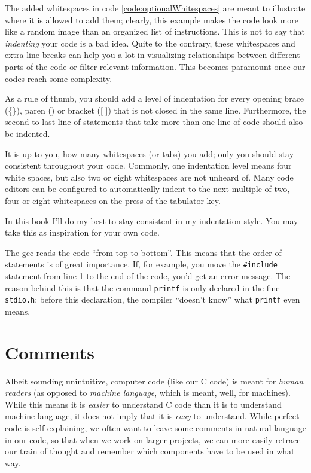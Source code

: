 \begin{hintbox}
The added whitespaces in code \ref{code:optionalWhitespaces} are meant to illustrate where it is allowed to add them; clearly, this example makes the code look more like a random image than an organized list of instructions. This is not to say that \emph{indenting} your code is a bad idea. Quite to the contrary, these whitespaces and extra line breaks can help you a lot in visualizing relationships between different parts of the code or filter relevant information. This becomes paramount once our codes reach some complexity.

As a rule of thumb, you should add a level of indentation for every opening brace (\{\}), paren () or bracket ([ ]) that is not closed in the same line. Furthermore, the second to last line of statements that take more than one line of code should also be indented.

It is up to you, how many whitespaces (or tabs) you add; only you should stay consistent throughout your code. Commonly, one indentation level means four white spaces, but also two or eight whitespaces are not unheard of. Many code editors can be configured to automatically indent to the next multiple of two, four or eight whitespaces on the press of the tabulator key.

In this book I'll do my best to stay consistent in my indentation style. You may take this as inspiration for your own code.
\end{hintbox}

The gcc reads the code \enquote{from top to bottom}. This means that the order of statements is of great importance. If, for example, you move the \texttt{\#include} statement from line 1 to the end of the code, you'd get an error message. The reason behind this is that the command \texttt{printf} is only declared in the fine \texttt{stdio.h}; before this declaration, the compiler \enquote{doesn't know} what \texttt{printf} even means.


\section{Comments}
Albeit sounding unintuitive, computer code (like our C code) is meant for \emph{human readers} (as opposed to \emph{machine language}, which is meant, well, for machines). While this means it is \emph{easier} to understand C code than it is to understand machine language, it does not imply that it is \emph{easy} to understand. While perfect code is self-explaining, we often want to leave some comments in natural language in our code, so that when we work on larger projects, we can more easily retrace our train of thought and remember which components have to be used in what way.

